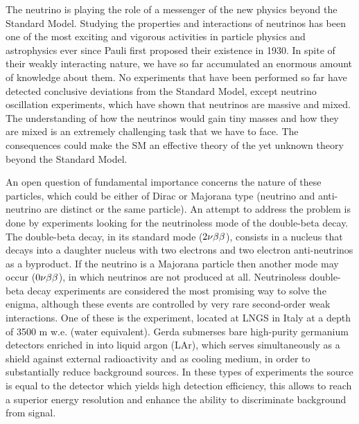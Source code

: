 	The neutrino is playing the role of a messenger of the new physics beyond the Standard Model. Studying the properties and interactions of neutrinos has been one of the most exciting and vigorous activities in particle physics and astrophysics ever since Pauli first proposed their existence in 1930. In spite of their weakly interacting nature, we have so far accumulated an enormous amount of knowledge about them. No experiments that have been performed so far have detected conclusive deviations from the Standard Model, except neutrino oscillation experiments, which have shown that neutrinos are massive and mixed. The understanding of how the neutrinos would gain tiny masses and how they are mixed is an extremely challenging task that we have to face. The consequences could make the SM an effective theory of the yet unknown theory beyond the Standard Model.

	An open question of fundamental importance concerns the nature of these particles, which could be either of Dirac or Majorana type (neutrino and anti-neutrino are distinct or the same particle). An attempt to address the problem is done by experiments looking for the neutrinoless mode of the double-beta decay. The double-beta decay, in its standard mode ($2\nu\beta\beta$), consists in a nucleus that decays into a daughter nucleus with two electrons and two electron anti-neutrinos as a byproduct. If the neutrino is a Majorana particle then another mode may occur ($0\nu\beta\beta$), in which neutrinos are not produced at all. Neutrinoless double-beta decay experiments are considered the most promising way to solve the enigma, although these events are controlled by very rare second-order weak interactions. One of these is the {\gerda} experiment, located at LNGS in Italy at a depth of 3500 m w.e. (water equivalent). Gerda submerses bare high-purity germanium detectors enriched in  into liquid argon (LAr), which serves simultaneously as a shield against external radioactivity and as cooling medium, in order to substantially reduce background sources. In these types of experiments the source is equal to the detector which yields high detection efficiency, this allows to reach a superior energy resolution and enhance the ability to discriminate background from signal.

